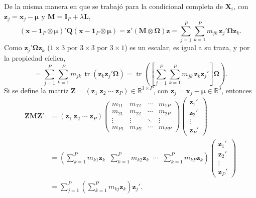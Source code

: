 \documentclass[11pt,a4paper]{article}
\begin{document}
De la misma manera en que se trabajó para la condicional completa de $\boldsymbol{X}_i$, con $\boldsymbol{z}_j = \boldsymbol{x}_j - \boldsymbol{\mu}$ y $\mathbf{M} = \mathbf{I}_P + \lambda\mathbf{L}$,
\[
(\boldsymbol{x} - \boldsymbol{1}_P \otimes \boldsymbol{\mu})' \mathbf{Q} (\boldsymbol{x} - \boldsymbol{1}_P \otimes \boldsymbol{\mu})
= \boldsymbol{z}'(\mathbf{M}\otimes\mathbf{\Omega})\boldsymbol{z}
= \sum_{j=1}^{P}\sum_{k=1}^{P} m_{jk}\,\boldsymbol{z}_j'\mathbf{\Omega}\boldsymbol{z}_k.
\]
Como $\boldsymbol{z}_j'\mathbf{\Omega}\boldsymbol{z}_k$ ($1\times3$ por $3\times3$ por $3\times1$) es un escalar, es igual a su traza, y por la propiedad cíclica,
\[
= \sum_{j=1}^{P}\sum_{k=1}^{P} m_{jk}\,\operatorname{tr}\left(\boldsymbol{z}_k\boldsymbol{z}_j'\mathbf{\Omega}\right)
= \operatorname{tr}\left( \left[ \sum_{j=1}^{P}\sum_{k=1}^{P} m_{jk}\,\boldsymbol{z}_k\boldsymbol{z}_j' \right] \mathbf{\Omega} \right).
\]
Si se define la matriz $\mathbf{Z} = (\boldsymbol{z}_1 \; \boldsymbol{z}_2 \; \cdots \; \boldsymbol{z}_P) \in \mathbb{R}^{3\times P}$, con $\boldsymbol{z}_j = \boldsymbol{x}_j - \boldsymbol{\mu} \in \mathbb{R}^{3}$, entonces
\begin{align*}
\mathbf{Z}\mathbf{M}\mathbf{Z}'
&= (\boldsymbol{z}_1 \; \boldsymbol{z}_2 \; \cdots \; \boldsymbol{z}_P)
\begin{pmatrix}
m_{11} & m_{12} & \cdots & m_{1P} \\
m_{21} & m_{22} & \cdots & m_{2P} \\
\vdots & \vdots & \ddots & \vdots \\
m_{P1} & m_{P2} & \cdots & m_{PP}
\end{pmatrix}
\begin{pmatrix} \boldsymbol{z}_1' \\ \boldsymbol{z}_2' \\ \vdots \\ \boldsymbol{z}_P' \end{pmatrix} \\
&= \left( \sum_{k=1}^{P} m_{k1}\boldsymbol{z}_k \;\; \sum_{k=1}^{P} m_{k2}\boldsymbol{z}_k \;\; \cdots \;\; \sum_{k=1}^{P} m_{kP}\boldsymbol{z}_k \right)
\begin{pmatrix} \boldsymbol{z}_1' \\ \boldsymbol{z}_2' \\ \vdots \\ \boldsymbol{z}_P' \end{pmatrix} \\
&= \sum_{j=1}^{P}\left( \sum_{k=1}^{P} m_{kj}\boldsymbol{z}_k \right)\boldsymbol{z}_j'.
\end{align*}
\end{document}
